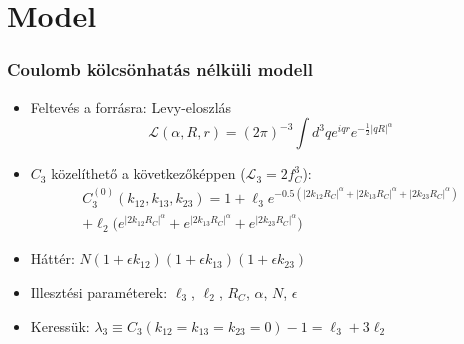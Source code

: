 \documentclass{beamer}
\begin{document}
\section{Model}
\begin{frame}
\frametitle{Coulomb kölcsönhatás nélküli modell}
\begin{itemize}
\setlength{\itemsep}{12pt}
\item Feltevés a forrásra: Levy-eloszlás
\begin{equation*}
\mathcal{L}(\alpha,R,r)=(2\pi)^{-3} \int d^3q e^{iqr} e^{-\frac{1}{2}|qR|^{\alpha}}
\end{equation*}
\item $C_3$ közelíthető a következőképpen ($\mathcal{L}_3=2f_C^3$):
\begin{align*}
C_3^{(0)}(k_{12}, k_{13}, k_{23}) = 1+ \ell_3e^{-0.5(|2k_{12}R_C|^\alpha+|2k_{13}R_C|^\alpha+|2k_{23}R_C|^\alpha)}\nonumber\\
+\ell_2\bigg(e^{|2k_{12}R_C|^\alpha}+e^{|2k_{13}R_C|^\alpha}+e^{|2k_{23}R_C|^\alpha}\bigg)
\end{align*}
\item Háttér: $N(1+\epsilon k_{12})(1+\epsilon k_{13})(1+\epsilon k_{23})$
\item Illesztési paraméterek: $\ell_3$, $\ell_2$,  $R_C$, $\alpha$, $N$, $\epsilon$
\item Keressük: $\lambda_3 \equiv  C_3(k_{12}=k_{13}=k_{23}=0)-1=\ell_3+3\ell_2$
\end{itemize}
\end{frame}
\end{document}
